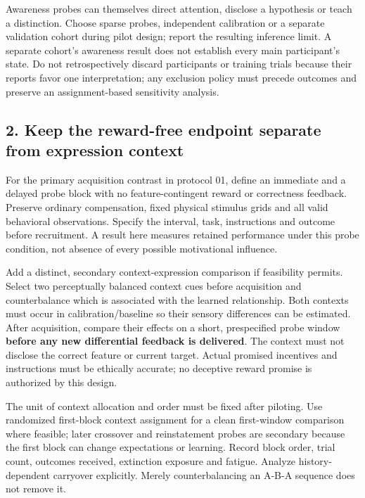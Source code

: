 \documentclass[
  american,
  11pt,
  letterpaper,
]{article}
\begin{document}
Awareness probes can themselves direct attention, disclose a hypothesis or teach a distinction. Choose sparse probes, independent calibration or a separate validation cohort during pilot design; report the resulting inference limit. A separate cohort's awareness result does not establish every main participant's state. Do not retrospectively discard participants or training trials because their reports favor one interpretation; any exclusion policy must precede outcomes and preserve an assignment-based sensitivity analysis.

\subsection{2. Keep the reward-free endpoint separate from expression context}\label{keep-the-reward-free-endpoint-separate-from-expression-context}

For the primary acquisition contrast in protocol 01, define an immediate and a delayed probe block with no feature-contingent reward or correctness feedback. Preserve ordinary compensation, fixed physical stimulus grids and all valid behavioral observations. Specify the interval, task, instructions and outcome before recruitment. A result here measures retained performance under this probe condition, not absence of every possible motivational influence.

Add a distinct, secondary context-expression comparison if feasibility permits. Select two perceptually balanced context cues before acquisition and counterbalance which is associated with the learned relationship. Both contexts must occur in calibration/baseline so their sensory differences can be estimated. After acquisition, compare their effects on a short, prespecified probe window \textbf{before any new differential feedback is delivered}. The context must not disclose the correct feature or current target. Actual promised incentives and instructions must be ethically accurate; no deceptive reward promise is authorized by this design.

The unit of context allocation and order must be fixed after piloting. Use randomized first-block context assignment for a clean first-window comparison where feasible; later crossover and reinstatement probes are secondary because the first block can change expectations or learning. Record block order, trial count, outcomes received, extinction exposure and fatigue. Analyze history-dependent carryover explicitly. Merely counterbalancing an A-B-A sequence does not remove it.
\end{document}
